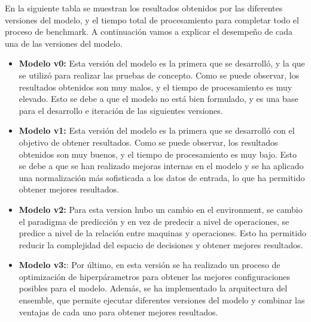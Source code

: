 En la siguiente tabla se muestran los resultados obtenidos por las
diferentes versiones del modelo, y el tiempo total de procesamiento
para completar todo el proceso de benchmark. A continuación vamos a
explicar el desempeño de cada una de las versiones del modelo.
\begin{itemize}
    \item \textbf{Modelo v0:} Esta versión del modelo es la primera que se
        desarrolló, y la que se utilizó para realizar las pruebas de
        concepto. Como se puede observar, los resultados obtenidos son
        muy malos, y el tiempo de procesamiento es muy elevado. Esto
        se debe a que el modelo no está bien formulado, y es una base
        para el desarrollo e iteración de las siguientes versiones.
    \item \textbf{Modelo v1:} Esta versión del modelo es la primera que
        se desarrolló con el objetivo de obtener resultados. Como se
        puede observar, los resultados obtenidos son muy buenos, y el
        tiempo de procesamiento es muy bajo. Esto se debe a que se han
        realizado mejoras internas en el modelo y se ha aplicado una
        normalización más sofisticada a los datos de entrada, lo que
        ha permitido obtener mejores resultados.
    \item \textbf{Modelo v2:} Para esta version hubo un cambio en el
        environment, se cambio el paradigma de predicción y en vez
        de predecir a nivel de operaciones, se predice a nivel de
        la relación entre maquinas y operaciones. Esto ha permitido
        reducir la complejidad del espacio de decisiones y obtener
        mejores resultados.
    \item \textbf{Modelo v3:}: Por último, en esta versión se ha
        realizado un proceso de optimización de hiperpárametros para obtener
        las mejores configuraciones posibles para el modelo. Además,
        se ha implementado la arquitectura del ensemble, que permite
        ejecutar diferentes versiones del modelo y combinar las
        ventajas de cada uno para obtener mejores resultados.
\end{itemize}

